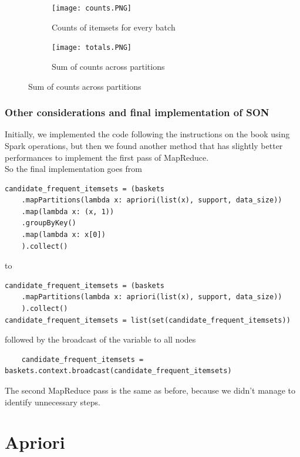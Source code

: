 \documentclass[a4paper]{article}
\begin{document}
	\begin{figure}[h]
		\centering
		
		\begin{subfigure}[b]{0.4\textwidth}
			\centering
			\texttt{[image: counts.PNG]}
         	\caption{Counts of itemsets for every batch}
         	\label{fig:counts}
		\end{subfigure}
		\hfill
		\begin{subfigure}[b]{0.4\textwidth}
			\centering
			\texttt{[image: totals.PNG]}
         	\caption{Sum of counts across partitions}
         	\label{fig:totals}
		\end{subfigure}
	\end{figure}
	
	
	\subsubsection{Other considerations and final implementation of SON}
	Initially, we implemented the code following the instructions on the book using Spark operations, but then we found another method that has slightly better performances to implement the first
	pass of MapReduce.\\
	So the final implementation goes from
	\begin{lstlisting}
candidate_frequent_itemsets = (baskets
    .mapPartitions(lambda x: apriori(list(x), support, data_size))
    .map(lambda x: (x, 1))                                             
    .groupByKey()                                                      
    .map(lambda x: x[0])                                               
    ).collect()
\end{lstlisting}
to
	\begin{lstlisting}
candidate_frequent_itemsets = (baskets
    .mapPartitions(lambda x: apriori(list(x), support, data_size))
    ).collect()
candidate_frequent_itemsets = list(set(candidate_frequent_itemsets))
\end{lstlisting}
followed by the broadcast of the variable to all nodes
\begin{lstlisting}
	candidate_frequent_itemsets = baskets.context.broadcast(candidate_frequent_itemsets)
\end{lstlisting}
	
	The second MapReduce pass is the same as before, because we didn't manage to identify unnecessary steps.

	\newpage
	
	\section{Apriori}
	\label{section:apriori}
	
\end{document}

